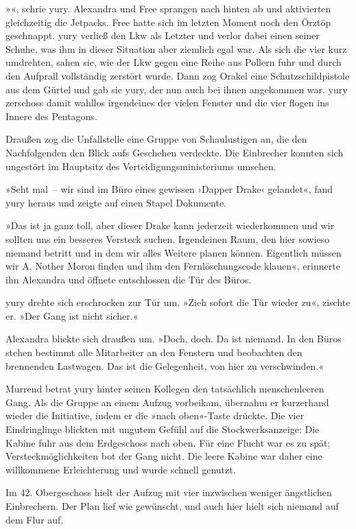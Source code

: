 »«, schrie yury. Alexandra und Free sprangen nach hinten ab und aktivierten gleichzeitig die Jetpacks. Free hatte sich im letzten Moment noch den Örztöp geschnappt. yury verließ den Lkw als Letzter und verlor dabei einen seiner Schuhe, was ihm in dieser Situation aber ziemlich egal war. Als sich die vier kurz umdrehten, sahen sie, wie der Lkw gegen eine Reihe aus Pollern fuhr und durch den Aufprall vollständig zerstört wurde. Dann zog Orakel eine Schutzschildpistole aus dem Gürtel und gab sie yury, der nun auch bei ihnen angekommen war. yury zerschoss damit wahllos irgendeines der vielen Fenster und die vier flogen ins Innere des Pentagons.

Draußen zog die Unfallstelle eine Gruppe von Schaulustigen an, die den Nachfolgenden den Blick aufs Geschehen verdeckte. Die Einbrecher konnten sich ungestört im Hauptsitz des Verteidigungsministeriums umsehen.

»Seht mal~– wir sind im Büro eines gewissen ›Dapper Drake‹ gelandet«, fand yury heraus und zeigte auf einen Stapel Dokumente.

»Das ist ja ganz toll, aber dieser Drake kann jederzeit wiederkommen und wir sollten uns ein besseres Versteck suchen. Irgendeinen Raum, den hier sowieso niemand betritt und in dem wir alles Weitere planen können. Eigentlich müssen wir A. Nother Moron finden und ihm den Fernlöschungscode klauen«, erinnerte ihn Alexandra und öffnete entschlossen die Tür des Büros.

yury drehte sich erschrocken zur Tür um. »Zieh sofort die Tür wieder zu«, zischte er. »Der Gang ist nicht sicher.«

Alexandra blickte sich draußen um. »Doch, doch. Da ist niemand. In den Büros stehen bestimmt alle Mitarbeiter an den Fenstern und beobachten den brennenden Lastwagen. Das ist die Gelegenheit, von hier zu verschwinden.«

Murrend betrat yury hinter seinen Kollegen den tatsächlich menschenleeren Gang. Als die Gruppe an einem Aufzug vorbeikam, übernahm er kurzerhand wieder die Initiative, indem er die »nach oben«-Taste drückte. Die vier Eindringlinge blickten mit ungutem Gefühl auf die Stockwerksanzeige: Die Kabine fuhr aus dem Erdgeschoss nach oben. Für eine Flucht war es zu spät; Versteckmöglichkeiten bot der Gang nicht. Die leere Kabine war daher eine willkommene Erleichterung und wurde schnell genutzt.

Im 42. Obergeschoss hielt der Aufzug mit vier inzwischen weniger ängstlichen Einbrechern. Der Plan lief wie gewünscht, und auch hier hielt sich niemand auf dem Flur auf.

